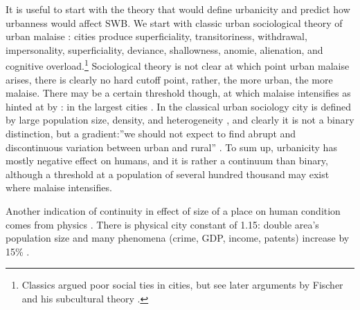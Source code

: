 \documentclass[10pt, letterpaper]{article}
\begin{document}
It is useful to start with the theory that would define urbanicity and predict how
urbanness would affect SWB. %
%
We start with classic urban sociological theory of urban malaise
 \citep{tonnies57,wirth38,simmel03,park15,park84}: cities produce superficiality,
transitoriness, withdrawal, impersonality, superficiality, deviance,
shallowness, anomie, alienation, and cognitive overload.\footnote{Classics
  argued poor social ties in cities, but see later arguments by Fischer  and his
  subcultural theory \citep{fischer95,fischer75,fischer72}.} 
 Sociological theory is not clear at which point urban malaise arises, there is clearly no hard
cutoff point, rather, the more urban, the more malaise. There may be a certain
threshold though, at which malaise intensifies as hinted at by
\citet{fischer73}: in the largest cities%
.
 In the classical urban sociology city is defined by large population size, density,
and heterogeneity \citep{wirth38}, and clearly it is not a binary distinction,
but a gradient:''we should not expect to find abrupt and discontinuous variation
between urban and rural'' \citep[][p. 2]{wirth38}. To sum up, urbanicity has mostly negative
effect on humans, and it is rather a continuum than binary, although a threshold
at a population of several hundred thousand may exist where malaise intensifies.

Another indication of continuity in effect of size of a place on human condition
comes from physics%
. There is physical city
constant of 1.15: double area's population size and many phenomena (crime, GDP, income, patents)  increase by 15\% \citep{blissCL_nov4_14,bettencourt10,bettencourt10b,bettencourt07}.
\end{document}
